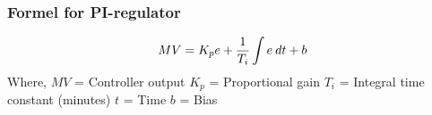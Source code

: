 \documentclass[aspectratio=169,xcolor=dvipsnames]{beamer}
\begin{document}
%
%
\begin{frame}
	\frametitle{Formel for PI-regulator}


$$MV = K_p e + {1 \over T_i} \int e \> dt + b$$
\vskip 5pt 
Where,
\vskip 5pt 
$MV$ = Controller output
\vskip 5pt 
$K_p$ = Proportional gain
\vskip 5pt 
$T_i$ = Integral time constant (minutes)
\vskip 5pt 
$t$ = Time
\vskip 5pt 
$b$ = Bias
\vskip 5pt 

\end{frame}
%
%
%
\end{document}
